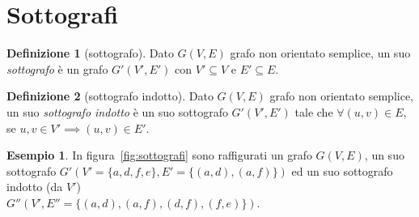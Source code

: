 \documentclass[a4paper, openany]{book}
\theoremstyle{plain}
\theoremstyle{definition}
\newtheorem{defn}{Definizione}[chapter]
\newtheorem{ese}{Esempio}[section]
\begin{document}
\section{Sottografi}
\begin{defn}[sottografo]
Dato  $G(V,E)$ grafo non orientato semplice, un suo \emph{sottografo} è un grafo
$G'(V',E')$ con $V' \subseteq V$ e $E' \subseteq E$.
\end{defn}

\begin{defn}[sottografo indotto]
Dato  $G(V,E)$ grafo non orientato semplice, un suo \emph{sottografo indotto} è un 
suo sottografo ${G'(V',E')}$ tale che ${\forall (u,v) \in E}$, se
${u,v \in V' \implies (u,v) \in E'}$.
\end{defn}

\begin{ese}
In figura~\ref{fig:sottografi} sono raffigurati un grafo ${G(V,E)}$, un suo sottografo
${G'(V' = \{a,d,f,e\}, E'= \{ (a,d), (a,f) \})}$ ed un suo sottografo indotto (da $V'$)\\
${G''(V', E''= \{ (a,d), (a,f), (d,f), (f,e) \})}$.
\begin{figure}[!ht]
    \centering
\end{figure}
\end{ese}
\end{document}
